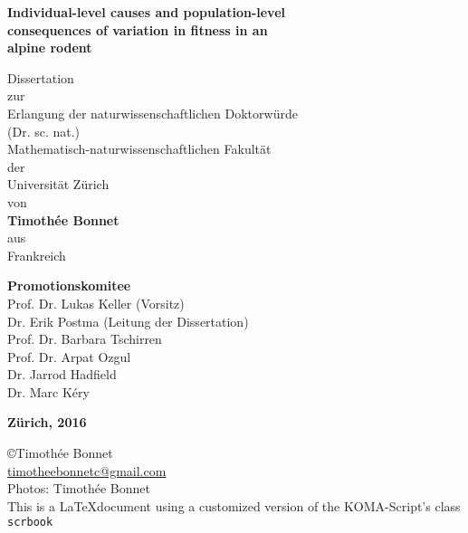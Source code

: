 \begin{titlepage}
	\thispagestyle{empty}
    \begin{center}
				 {\onehalfspacing \LARGE\selectfont\upshape\bfseries{Individual-level causes and population-level\\consequences of variation in fitness in an\\alpine rodent\\}}
				
				\vspace{1cm}
				
				\noindent\makebox[\linewidth]{\rule{0.8\paperwidth}{1pt}}
        
        \vspace{1cm}
				{\fontsize{22}{32pt}
				\doublespacing
        Dissertation
				\\
				zur
				\\
				Erlangung der naturwissenschaftlichen Doktorw\"urde
				\\
        (Dr. sc. nat.)
				\\
				Mathematisch-naturwissenschaftlichen Fakult\"at
				\\
				der
				\\
				Universit\"at Z\"urich
				\\
				von
				\\
        \vspace{1cm}
        \textbf{Timoth\'ee Bonnet}
        \\
				aus
				\\
				Frankreich
				
				\vspace{1cm}
				\textbf{Promotionskomitee}
				\\
				Prof. Dr. Lukas Keller (Vorsitz)
				\\
				Dr. Erik Postma (Leitung der Dissertation)
				\\
				Prof. Dr. Barbara Tschirren
				\\
				Prof. Dr. Arpat Ozgul
				\\
				Dr. Jarrod Hadfield
				\\
				Dr. Marc K\'ery
				\\
				}
        \vfill
        
        \textbf{Z\"urich, 2016}
    \end{center}
	
\end{titlepage}

	\clearpage
\begin{titlepage}
	\thispagestyle{empty}

\null\vfill
\noindent \copyright  Timoth\'ee Bonnet\\
\href{mailto:timotheebonnetc@gmail.com}{timotheebonnetc@gmail.com}\\
Photos: Timoth\'ee Bonnet\\
This is a \LaTeX document using a customized version of the KOMA-Script's class \texttt{scrbook}
\end{titlepage}